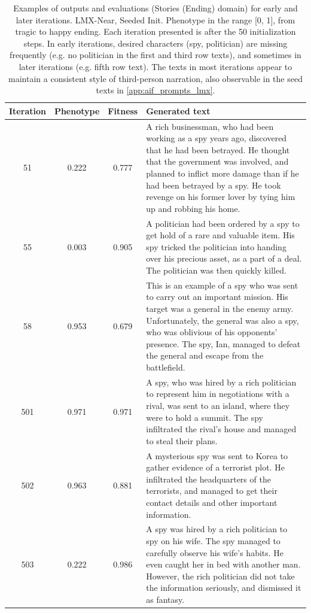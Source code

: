\begin{table}[ht]
  \caption{Examples of outputs and evaluations (Stories (Ending) domain) for early and later iterations. LMX-Near, Seeded Init. Phenotype in the range [0, 1], from tragic to happy ending. Each iteration presented is after the 50 initialization steps. In early iterations, desired characters (spy, politician) are missing frequently (e.g. no politician in the first and third row texts), and sometimes in later iterations (e.g. fifth row text). The texts in most iterations appear to maintain a consistent style of third-person narration, also observable in the seed texts in \ref{app:aif_prompts_lmx}.}
  \begin{center}
  \small
  \begin{tabular}{cccp{8.5cm}}
    \toprule
    Iteration     & Phenotype  & Fitness     & Generated text \\
    \midrule
    51 &  0.222 & 0.777 & A rich businessman, who had been working as a spy years ago, discovered that he had been betrayed. He thought that the government was involved, and planned to inflict more damage than if he had been betrayed by a spy. He took revenge on his former lover by tying him up and robbing his home. \\
    \midrule
    55 & 0.003 & 0.905 & A politician had been ordered by a spy to get hold of a rare and valuable item. His spy tricked the politician into handing over his precious asset, as a part of a deal. The politician was then quickly killed. \\
    \midrule
    58 & 0.953 & 0.679 & This is an example of a spy who was sent to carry out an important mission. His target was a general in the enemy army. Unfortunately, the general was also a spy, who was oblivious of his opponents' presence. The spy, Ian, managed to defeat the general and escape from the battlefield. \\
    \midrule
    \midrule
    501 &  0.971 & 0.971 & A spy, who was hired by a rich politician to represent him in negotiations with a rival, was sent to an island, where they were to hold a summit. The spy infiltrated the rival's house and managed to steal their plans. \\
    \midrule
    502 & 0.963 & 0.881 & A mysterious spy was sent to Korea to gather evidence of a terrorist plot. He infiltrated the headquarters of the terrorists, and managed to get their contact details and other important information. \\
    \midrule
    503 & 0.222 & 0.986 & A spy was hired by a rich politician to spy on his wife. The spy managed to carefully observe his wife's habits. He even caught her in bed with another man. However, the rich politician did not take the information seriously, and dismissed it as fantasy. \\
    \bottomrule
  \end{tabular}
  \end{center}
  \label{app:table_iter_stories_ending_near_seed}
\end{table}

